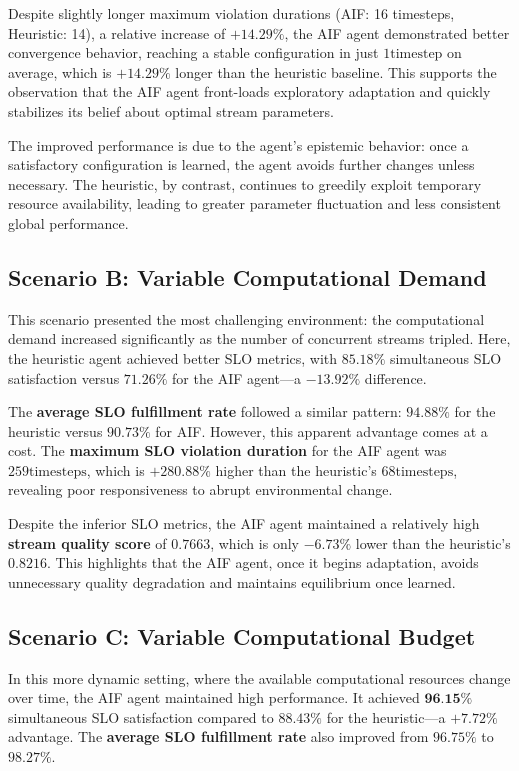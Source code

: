 Despite slightly longer maximum violation durations (AIF: 16 timesteps, Heuristic: 14), a relative increase of \(+14.29\%\), the AIF agent demonstrated better convergence behavior, reaching a stable configuration in just \(1 \text{timestep}\) on average, which is \(+14.29\%\) longer than the heuristic baseline. This supports the observation that the AIF agent front-loads exploratory adaptation and quickly stabilizes its belief about optimal stream parameters.

The improved performance is due to the agent’s epistemic behavior: once a satisfactory configuration is learned, the agent avoids further changes unless necessary. The heuristic, by contrast, continues to greedily exploit temporary resource availability, leading to greater parameter fluctuation and less consistent global performance.

\subsection{Scenario B: Variable Computational Demand}

This scenario presented the most challenging environment: the computational demand increased significantly as the number of concurrent streams tripled. Here, the heuristic agent achieved better SLO metrics, with \(85.18\%\) simultaneous SLO satisfaction versus \(71.26\%\) for the AIF agent---a \(-13.92\%\) difference.

The \textbf{average SLO fulfillment rate} followed a similar pattern: \(94.88\%\) for the heuristic versus \(90.73\%\) for AIF. However, this apparent advantage comes at a cost. The \textbf{maximum SLO violation duration} for the AIF agent was \(259\text{timesteps}\), which is \(+280.88\%\) higher than the heuristic’s \(68\text{timesteps}\), revealing poor responsiveness to abrupt environmental change.

Despite the inferior SLO metrics, the AIF agent maintained a relatively high \textbf{stream quality score} of \(0.7663\), which is only \(-6.73\%\) lower than the heuristic’s \(0.8216\). This highlights that the AIF agent, once it begins adaptation, avoids unnecessary quality degradation and maintains equilibrium once learned.

\subsection{Scenario C: Variable Computational Budget}

In this more dynamic setting, where the available computational resources change over time, the AIF agent maintained high performance. It achieved \(\textbf{96.15}\%\) simultaneous SLO satisfaction compared to \(88.43\%\) for the heuristic---a \(+7.72\%\) advantage. The \textbf{average SLO fulfillment rate} also improved from \(96.75\%\) to \(98.27\%\).

